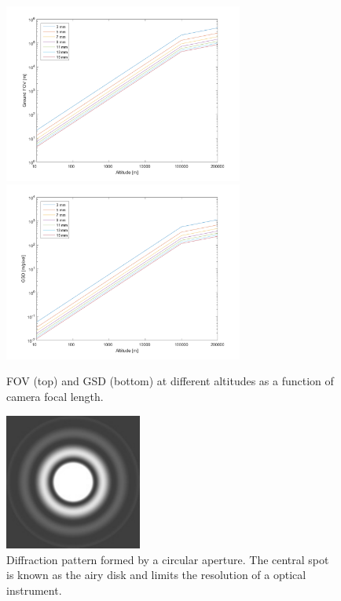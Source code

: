 \begin{figure}[htb]
\begin{center}
\includegraphics[width=0.7\textwidth]{figures/navtheory/FOV} 
\includegraphics[width=0.7\textwidth]{figures/navtheory/GSD}
\caption{FOV (top) and GSD (bottom) at different altitudes as a function of  camera focal length.}
\label{cameramatlab}
\end{center}
\end{figure}



\begin{figure}[htb]
\begin{center}
\includegraphics[width=0.4\textwidth]{figures/navtheory/airy}
\caption{Diffraction pattern formed by a circular aperture. The central spot is known as the airy disk and limits the resolution of a optical instrument.}
\label{airy}
\end{center}
\end{figure}

